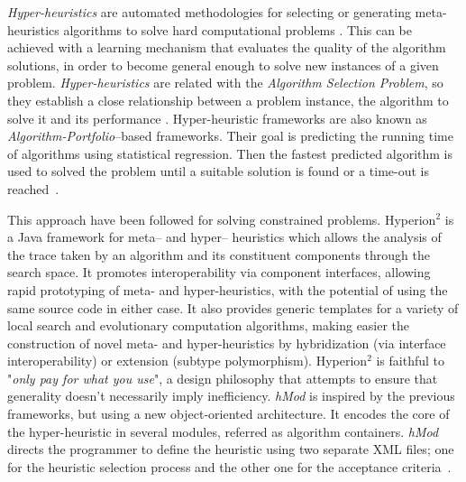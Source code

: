 \textit{Hyper-heuristics} are automated methodologies for selecting or generating meta-heuristics algorithms to solve hard computational problems \cite{Chakhlevitch2008}. This can be achieved with a learning mechanism that evaluates the quality of the algorithm solutions, in order to become general enough to solve new instances of a given problem. \textit{Hyper-heuristics} are related with the \textit{Algorithm Selection Problem}, so they establish a close relationship between a problem instance, the algorithm to solve it and its performance \cite{Ryser-welch}. Hyper-heuristic frameworks are also known as \textit{Algorithm-Portfolio}--based frameworks. Their goal is predicting the running time of algorithms using statistical regression. Then the fastest predicted algorithm is used to solved the problem until a suitable solution is found or a time-out is reached~\cite{Leyton-Brown2003}.

This approach have been followed for solving constrained problems. {\sc Hyperion}$^2$ \cite{Brownlee2014} is a Java framework for meta-- and hyper-- heuristics which allows the analysis of the trace taken by an algorithm and its constituent components through the search space. It promotes interoperability via component interfaces, allowing rapid prototyping of meta- and hyper-heuristics, with the potential of using the same source code in either case. It also provides generic templates for a variety of local search and evolutionary computation algorithms, making easier the construction of novel meta- and hyper-heuristics by hybridization (via interface interoperability) or extension (subtype polymorphism). {\sc Hyperion}$^2$ is faithful to "{\it only pay for what you use}", a design philosophy that attempts to ensure that generality doesn't necessarily imply inefficiency. \textit{hMod} is inspired by the previous frameworks, but using a new object-oriented architecture. It encodes the core of the hyper-heuristic in several modules, referred as algorithm containers. \textit{hMod} directs the programmer to define the heuristic using two separate XML files; one for the heuristic selection process and the other one for the acceptance criteria~\cite{Urra2013}.

